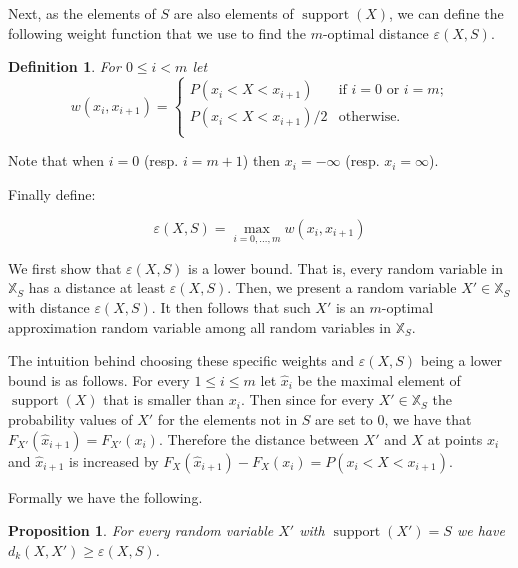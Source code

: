 \documentclass{article}
\newtheorem{definition}[thm]{Definition}
\newtheorem{proposition}[thm]{Proposition}
\DeclareMathOperator{\support}{support}
\begin{document}
Next, as the elements of $S$ are also elements of $\support(X)$, we can define the following weight function that we use to find the $m$-optimal distance $\varepsilon(X,S)$. 

\begin{definition}\label{def:weight} For $0\leq i < m$ let
	\[
	w(x_i,x_{i+1})=
	\begin{cases}
	P(x_i < X < x_{i+1}) & \text{if $i=0$ or $i = m$;} \\
	P(x_i < X < x_{i+1})/2 & \text{otherwise.} \\	
	\end{cases}
	\]
\end{definition}

Note that when $i=0$ (resp. $i=m+1$) then $x_i = -\infty$ (resp. $x_i = \infty$).

Finally define:

\begin{equation}
\varepsilon(X,S) = \max\limits_{i=0,\dots,m} w(x_{i}, x_{i+1})
\end{equation}


We first show that $\varepsilon(X,S)$ is a lower bound. That is, every random variable in $\mathbb{X}_S$ has a distance at least $\varepsilon(X,S)$. Then, we present a random variable $X'\in \mathbb{X}_S$ with distance $\varepsilon(X,S)$. It then follows that such $X'$ is an $m$-optimal approximation random variable among all random variables in $\mathbb{X}_S$.

The intuition behind choosing these specific weights and $\varepsilon(X,S)$ being a lower bound is as follows. For every $1\leq i \leq m$ let $\hat x_i$ be the maximal element of $\support(X)$ that is smaller than $x_i$. Then since for every $X'\in\mathbb{X}_S$ the probability values of $X'$ for the elements not in $S$ are set to $0$, we have that $F_{X'}(\hat x_{i+1})=F_{X'}(x_i)$. Therefore the distance between $X'$ and $X$ at points $x_i$ and $\hat x_{i+1}$ is increased by $F_X(\hat x_{i+1})-F_X(x_i) = P(x_i < X < x_{i+1})$.

Formally we have the following.

\begin{proposition}\label{prop:minimal}
	For every random variable $X'$ with $\support(X')=S$ we have $d_k(X,X') \geq \varepsilon(X,S)$.
\end{proposition}
\end{document}
